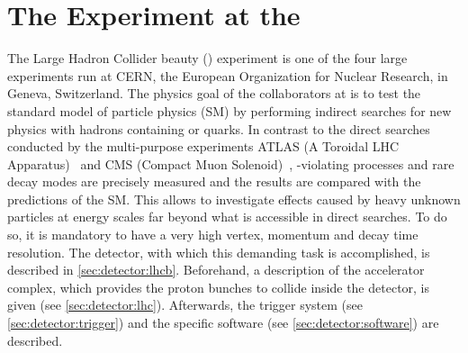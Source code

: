 
\chapter{The \lhcb Experiment at the \lhc}
\label{sec:detector}

The Large Hadron Collider beauty (\lhcb) experiment is one of the four large
experiments run at CERN, the European Organization for Nuclear Research, in
Geneva, Switzerland. The physics goal of the collaborators at \lhcb is to test
the standard model of particle physics (SM) by performing indirect searches
for new physics with hadrons containing \bquark or \cquark quarks. In contrast
to the direct searches conducted by the multi-purpose experiments ATLAS (A
Toroidal LHC Apparatus)~\cite{ATLAS} and CMS (Compact Muon
Solenoid)~\cite{CMS}, \CP-violating processes and rare decay modes are
precisely measured and the results are compared with the predictions of the
SM. This allows to investigate effects caused by heavy unknown particles at
energy scales far beyond what is accessible in direct searches. To do so, it is
mandatory to have a very high vertex, momentum and decay time resolution. The
detector, with which this demanding task is accomplished, is described in
\cref{sec:detector:lhcb}. Beforehand, a description of the accelerator
complex, which provides the proton bunches to collide inside the detector, is
given (see \cref{sec:detector:lhc}). Afterwards, the trigger system (see
\cref{sec:detector:trigger}) and the specific software (see
\cref{sec:detector:software}) are described.







